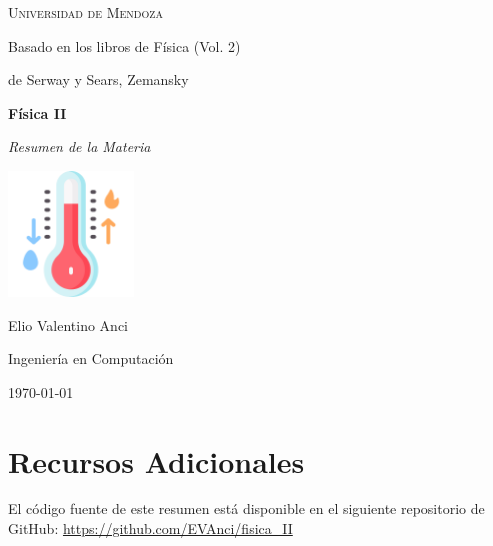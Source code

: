 \documentclass[a4paper,12pt]{article}  %
\begin{document}
\begin{titlepage}
  \centering
  \vspace*{2cm} %

  {\scshape\LARGE Universidad de Mendoza\par}
  \vspace{2cm}
  {\large Basado en los libros de Física (Vol. 2)\par}
  {\large de Serway y Sears, Zemansky\par}
  \vspace{1.5cm}

  {\Huge\bfseries Física II\par}
  \vspace{0.5cm}
  {\Large\itshape Resumen de la Materia\par} %

  \vspace{1.5cm}
  \includegraphics[width=0.25\textwidth]{images/cover.png} %
  \vspace{1.5cm}

  {\Large Elio Valentino Anci\par}
  {\large Ingeniería en Computación\par}

  \vfill

  {\large \today\par}
\end{titlepage}

\newpage

\tableofcontents  %

\newpage


\newpage

\newpage

\newpage

\newpage

\newpage

\newpage

\newpage

\newpage
\section*{Recursos Adicionales}

El código fuente de este resumen está disponible en el siguiente repositorio de GitHub: \url{https://github.com/EVAnci/fisica_II}
\end{document}
